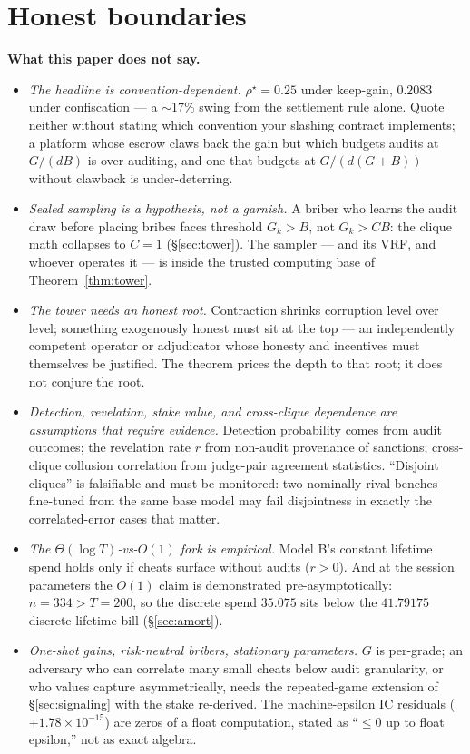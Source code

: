 \documentclass[11pt,a4paper]{article}
\begin{document}
\section{Honest boundaries}\label{sec:boundaries}
\begin{boundary}
\textbf{What this paper does not say.}
\begin{itemize}[leftmargin=1.6em,itemsep=2pt]
\item \emph{The headline is convention-dependent.} $\rho^\star = 0.25$ under keep-gain, $0.2083$ under confiscation --- a $\sim$17\% swing from the settlement rule alone. Quote neither without stating which convention your slashing contract implements; a platform whose escrow claws back the gain but which budgets audits at $G/(dB)$ is over-auditing, and one that budgets at $G/(d(G{+}B))$ without clawback is under-deterring.
\item \emph{Sealed sampling is a hypothesis, not a garnish.} A briber who learns the audit draw before placing bribes faces threshold $G_k > B$, not $G_k > CB$: the clique math collapses to $C{=}1$ (\S\ref{sec:tower}). The sampler --- and its VRF, and whoever operates it --- is inside the trusted computing base of Theorem~\ref{thm:tower}.
\item \emph{The tower needs an honest root.} Contraction shrinks corruption level over level; something exogenously honest must sit at the top --- an independently competent operator or adjudicator whose honesty and incentives must themselves be justified. The theorem prices the depth to that root; it does not conjure the root.
\item \emph{Detection, revelation, stake value, and cross-clique dependence are assumptions that require evidence.} Detection probability comes from audit outcomes; the revelation rate $r$ from non-audit provenance of sanctions; cross-clique collusion correlation from judge-pair agreement statistics. ``Disjoint cliques'' is falsifiable and must be monitored: two nominally rival benches fine-tuned from the same base model may fail disjointness in exactly the correlated-error cases that matter.
\item \emph{The $\Theta(\log T)$-vs-$O(1)$ fork is empirical.} Model B's constant lifetime spend holds only if cheats surface without audits ($r>0$). And at the session parameters the $O(1)$ claim is demonstrated pre-asymptotically: $n=334>T=200$, so the discrete spend $35.075$ sits below the $41.79175$ discrete lifetime bill (\S\ref{sec:amort}).
\item \emph{One-shot gains, risk-neutral bribers, stationary parameters.} $G$ is per-grade; an adversary who can correlate many small cheats below audit granularity, or who values capture asymmetrically, needs the repeated-game extension of \S\ref{sec:signaling} with the stake re-derived. The machine-epsilon IC residuals ($+1.78\times 10^{-15}$) are zeros of a float computation, stated as ``$\le 0$ up to float epsilon,'' not as exact algebra.
\end{itemize}
\end{boundary}
\end{document}
